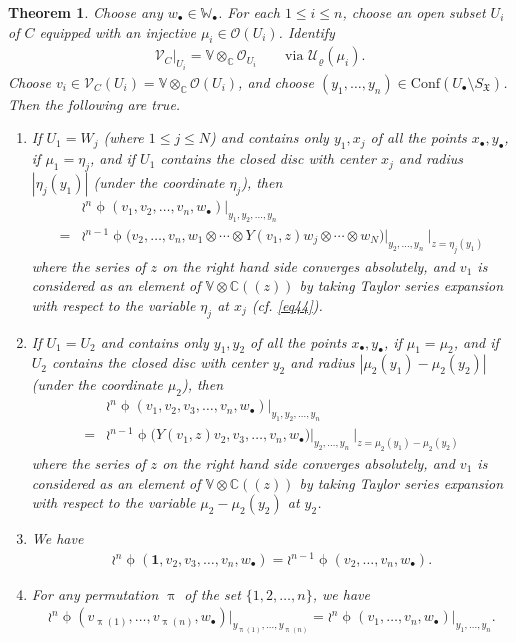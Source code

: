\documentclass[11pt,b5paper,notitlepage]{article}
\theoremstyle{definition}
\theoremstyle{plain}
\newtheorem{thm}[df]{Theorem}
\newcommand{\fk}{\mathfrak}
\newcommand{\mc}{\mathcal}
\newcommand{\id}{\mathbf{1}}
\newcommand{\Conf}{\mathrm{Conf}}
\newcommand{\scr}{\mathscr}
\newcommand{\SX}{{S_{\fk X}}}
\newcommand{\blt}{\bullet}
\newcommand{\Vbb}{\mathbb V}
\newcommand{\Wbb}{\mathbb W}
\newcommand{\Cbb}{\mathbb C}
\numberwithin{equation}{subsection}
\begin{document}
\begin{thm}
Choose any $w_\blt\in\Wbb_\blt$. For each $1\leq i\leq n$, choose an open subset  $U_i$  of $C$ equipped with an injective $\mu_i\in\scr O(U_i)$. Identify 
\begin{align*}
	\scr V_C\big|_{U_i}=\Vbb\otimes_\Cbb\scr O_{U_i}	\qquad\text{via }\mc U_\varrho(\mu_i).
\end{align*}
Choose $v_i\in\scr V_C(U_i)=\Vbb\otimes_\Cbb\scr O(U_i)$, and choose $(y_1,\dots,y_n)\in\Conf(U_\blt\setminus\SX)$. Then the following are true.
\begin{enumerate}[label=(\arabic*)]
\item If $U_1=W_j$ (where $1\leq j\leq N$) and contains only $y_1,x_j$ of all the points $x_\blt,y_\blt$, if $\mu_1=\eta_j$, and if $U_1$ contains the closed disc with center $x_j$ and radius $|\eta_j(y_1)|$ (under the coordinate $\eta_j$), then
\begin{align}
&\wr^n\upphi(v_1,v_2,\dots,v_n,w_\blt)\big|_{y_1,y_2,\dots,y_n}\nonumber\\
=&\wr^{n-1}\upphi\big(v_2,\dots,v_n,w_1\otimes\cdots\otimes Y(v_1,z)w_j\otimes\cdots\otimes w_N\big)\big|_{y_2,\dots,y_n}~\big|_{z=\eta_j(y_1)}\label{eq8}
\end{align}
where the series of $z$ on the right hand side converges absolutely, and $v_1$ is considered as an element of $\Vbb\otimes\Cbb((z))$ by taking Taylor series expansion with respect to the variable $\eta_j$ at $x_j$ (cf. \eqref{eq44}).
\item If $U_1=U_2$ and contains only $y_1,y_2$ of all the  points $x_\blt,y_\blt$, if $\mu_1=\mu_2$, and if $U_2$ contains the closed disc with center $y_2$ and radius $|\mu_2(y_1)-\mu_2(y_2)|$ (under the coordinate $\mu_2$), then
\begin{align}
&\wr^n\upphi(v_1,v_2,v_3,\dots,v_n,w_\blt)\big|_{y_1,y_2,\dots,y_n}\nonumber\\
=&\wr^{n-1}\upphi\big(Y(v_1,z)v_2,v_3,\dots,v_n,w_\blt\big)\big |_{y_2,\dots,y_n}~\big |_{z=\mu_2(y_1)-\mu_2(y_2)}\label{eq9}
\end{align}
where the series of $z$ on the right hand side converges absolutely, and $v_1$ is considered as an element of $\Vbb\otimes\Cbb((z))$ by taking Taylor series expansion with respect to the variable $\mu_2-\mu_2(y_2)$ at $y_2$.
\item  We have
\begin{align}
\wr^n\upphi(\id,v_2,v_3,\dots,v_n,w_\blt)=\wr^{n-1}\upphi(v_2,\dots,v_n,w_\blt).
\end{align}
\item For any permutation $\uppi$ of the set $\{1,2,\dots,n\}$, we have
\begin{align}
\wr^n\upphi(v_{\uppi(1)},\dots,v_{\uppi(n)},w_\blt)\big|_{y_{\uppi(1)},\dots,y_{\uppi(n)}}=\wr^n\upphi(v_1,\dots,v_n,w_\blt)\big|_{y_1,\dots,y_n}.
\end{align}
\end{enumerate}
\end{thm}
\end{document}
